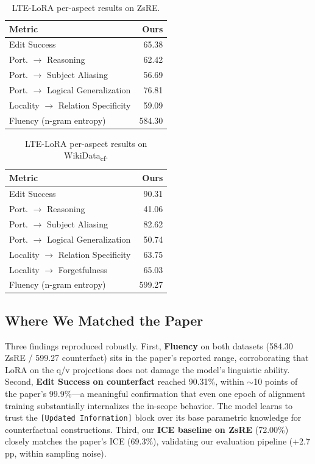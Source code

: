\documentclass[11pt,a4paper,twocolumn]{article}
\begin{document}
\begin{table}[t]
\centering
\small
\caption{LTE-LoRA per-aspect results on ZsRE.}
\label{tab:zsre_detail}
\begin{tabular}{lr}
\toprule
\textbf{Metric} & \textbf{Ours} \\
\midrule
Edit Success & 65.38 \\
Port. $\rightarrow$ Reasoning & 62.42 \\
Port. $\rightarrow$ Subject Aliasing & 56.69 \\
Port. $\rightarrow$ Logical Generalization & 76.81 \\
Locality $\rightarrow$ Relation Specificity & 59.09 \\
Fluency (n-gram entropy) & 584.30 \\
\bottomrule
\end{tabular}
\end{table}

\begin{table}[t]
\centering
\small
\caption{LTE-LoRA per-aspect results on WikiData\textsubscript{cf}.}
\label{tab:cf_detail}
\begin{tabular}{lr}
\toprule
\textbf{Metric} & \textbf{Ours} \\
\midrule
Edit Success & 90.31 \\
Port. $\rightarrow$ Reasoning & 41.06 \\
Port. $\rightarrow$ Subject Aliasing & 82.62 \\
Port. $\rightarrow$ Logical Generalization & 50.74 \\
Locality $\rightarrow$ Relation Specificity & 63.75 \\
Locality $\rightarrow$ Forgetfulness & 65.03 \\
Fluency (n-gram entropy) & 599.27 \\
\bottomrule
\end{tabular}
\end{table}

\subsection{Where We Matched the Paper}

Three findings reproduced robustly. First, \textbf{Fluency} on both datasets (584.30 ZsRE / 599.27 counterfact) sits in the paper's reported range, corroborating that LoRA on the q/v projections does not damage the model's linguistic ability. Second, \textbf{Edit Success on counterfact} reached 90.31\%, within ${\sim}$10 points of the paper's 99.9\%---a meaningful confirmation that even one epoch of alignment training substantially internalizes the in-scope behavior. The model learns to trust the \texttt{[Updated Information]} block over its base parametric knowledge for counterfactual constructions. Third, our \textbf{ICE baseline on ZsRE} (72.00\%) closely matches the paper's ICE (69.3\%), validating our evaluation pipeline (+2.7\,pp, within sampling noise).
\end{document}
